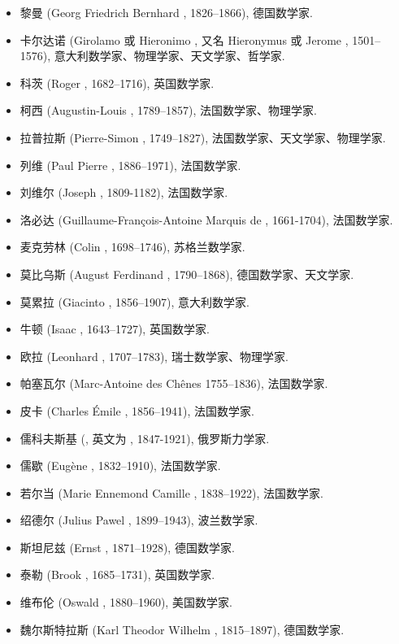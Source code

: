 \begin{itemize}
  \item 黎曼 (Georg Friedrich Bernhard , 1826--1866), 德国数学家.
  \item 卡尔达诺 (Girolamo 或 Hieronimo , 又名 Hieronymus  或 Jerome , 1501--1576), 意大利数学家、物理学家、天文学家、哲学家.
  \item 科茨 (Roger , 1682--1716), 英国数学家.
  \item 柯西 (Augustin-Louis , 1789--1857), 法国数学家、物理学家.
  \item 拉普拉斯 (Pierre-Simon , 1749--1827), 法国数学家、天文学家、物理学家.
  \item 列维 (Paul Pierre , 1886--1971), 法国数学家.
  \item 刘维尔 (Joseph , 1809-1182), 法国数学家.
  \item 洛必达 (Guillaume-François-Antoine Marquis de , 1661-1704), 法国数学家.
  \item 麦克劳林 (Colin , 1698--1746), 苏格兰数学家.
  \item 莫比乌斯 (August Ferdinand , 1790--1868), 德国数学家、天文学家.
  \item 莫累拉 (Giacinto , 1856--1907), 意大利数学家.
  \item 牛顿 (Isaac , 1643--1727), 英国数学家.
  \item 欧拉 (Leonhard , 1707--1783), 瑞士数学家、物理学家.
  \item 帕塞瓦尔 (Marc-Antoine  des Chênes 1755--1836), 法国数学家.
  \item 皮卡 (Charles Émile , 1856--1941), 法国数学家.
  \item 儒科夫斯基 (, 英文为 , 1847-1921), 俄罗斯力学家.
  \item 儒歇 (Eugène , 1832--1910), 法国数学家.
  \item 若尔当 (Marie Ennemond Camille , 1838--1922), 法国数学家.
  \item 绍德尔 (Julius Pawel , 1899--1943), 波兰数学家.
  \item 斯坦尼兹 (Ernst , 1871--1928), 德国数学家.
  \item 泰勒 (Brook , 1685--1731), 英国数学家.
  \item 维布伦 (Oswald , 1880--1960), 美国数学家.
  \item 魏尔斯特拉斯 (Karl Theodor Wilhelm , 1815--1897), 德国数学家.
\end{itemize}
